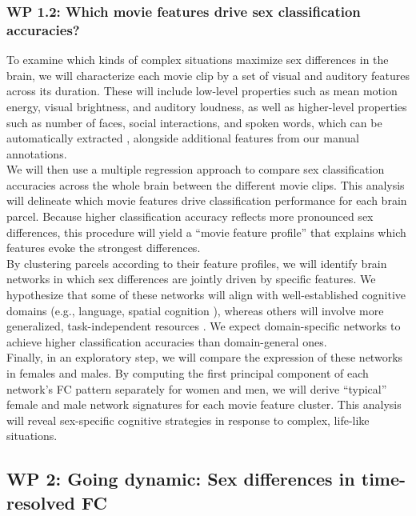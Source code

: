 \documentclass[11pt,a4paper]{article}
\begin{document}
\subsubsection*{WP 1.2: Which movie features drive sex classification accuracies?}
To examine which kinds of complex situations maximize sex differences in the brain, we will characterize 
each movie clip by a set of visual and auditory features across its duration. 
These will include low-level properties such as mean motion energy, visual brightness, 
and auditory loudness, as well as higher-level properties such as number of faces, 
social interactions, and spoken words, which can be automatically extracted 
\parencite{mcnamaraDevelopingComprehensiveFramework2017a,radfordRobustSpeechRecognition2022}, 
alongside additional features from our manual annotations.\\  
We will then use a multiple regression approach to compare sex classification accuracies across the whole 
brain between the different movie clips. This analysis will delineate which movie features drive 
classification performance for each brain parcel. Because higher classification accuracy reflects more 
pronounced sex differences, this procedure will yield a “movie feature profile” that explains which 
features evoke the strongest differences.\\  
By clustering parcels according to their feature profiles, we will identify brain networks in which 
sex differences are jointly driven by specific features. We hypothesize that some of these networks will 
align with well-established cognitive domains (e.g., language, spatial cognition 
\parencite{halpernSexDifferencesCognitive2000a,kimuraSexCognition2000a}), whereas others will 
involve more generalized, task-independent resources \parencite{hugdahlExistenceGeneralizedNonspecific2015a}. 
We expect domain-specific networks to achieve higher classification accuracies than domain-general ones.\\ 
Finally, in an exploratory step, we will compare the expression of these networks in females and males. 
By computing the first principal component of each network’s FC pattern separately for women and men, 
we will derive “typical” female and male network signatures for each movie feature cluster. 
This analysis will reveal sex-specific cognitive strategies in response to complex, life-like situations.

\subsection*{WP 2: Going dynamic: Sex differences in time-resolved FC}
\end{document}
